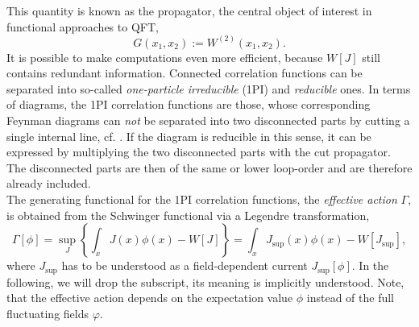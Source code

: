 This quantity is known as the propagator, the central object of interest in functional approaches to QFT, 
\begin{equation}
	G(x_1,x_2) := W^{(2)}(x_1,x_2).
\end{equation}
It is possible to make computations even more efficient, because $W[J]$ still contains redundant information. Connected correlation functions can be separated into so-called \textit{one-particle irreducible} (1PI) and \textit{reducible} ones. In terms of diagrams, the 1PI correlation functions are those, whose corresponding Feynman diagrams can \textit{not} be separated into two disconnected parts by cutting a single internal line, cf. . If the diagram is reducible in this sense, it can be expressed by multiplying the two disconnected parts with the cut propagator. The disconnected parts are then of the same or lower loop-order and are therefore already included.\\
The generating functional for the  1PI correlation functions, the \textit{effective action} $\Gamma$, is obtained from the Schwinger functional via a Legendre transformation, 
\begin{equation}
	\Gamma[\phi]=\sup _{J}\left\{\int_{x} J(x) \phi(x)-W[J]\right\}=\int_{x} J_{\mathrm{sup}}(x) \phi(x)-W\left[J_{\mathrm{sup}}\right],
\label{eqn:Def_Gamma}
\end{equation}
where $J_{\mathrm{sup}}$ has to be understood as a field-dependent current $J_{\mathrm{sup}}[\phi]$. In the following, we will drop the subscript, its meaning is implicitly understood. Note, that the effective action depends on the expectation value $\phi$ instead of the full fluctuating fields $\varphi$.

